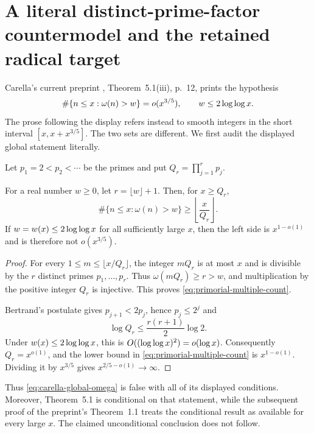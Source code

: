 \section{A literal distinct-prime-factor countermodel and the retained radical target}
\label{sec:carella-global-omega}

Carella's current preprint \cite{Carella}, Theorem~5.1(iii), p.~12,
prints the hypothesis
\begin{equation}\label{eq:carella-global-omega}
 \#\{n\le x:\omega(n)>w\}=o(x^{3/5}),
 \qquad w\le2\log\log x.
\end{equation}
The prose following the display refers instead to smooth integers in the
short interval $[x,x+x^{3/5}]$.  The two sets are different.  We first audit
the displayed global statement literally.

Let $p_1=2<p_2<\cdots$ be the primes and put
$Q_r=\prod_{j=1}^r p_j$.

\begin{theorem}
\label{thm:carella-primorial-multiples}
For a real number $w\ge0$, let $r=\lfloor w\rfloor+1$.  Then, for
$x\ge Q_r$,
\begin{equation}\label{eq:primorial-multiple-count}
 \#\{n\le x:\omega(n)>w\}\ge
       \left\lfloor\frac{x}{Q_r}\right\rfloor.
\end{equation}
If $w=w(x)\le2\log\log x$ for all sufficiently large $x$, then the
left side is $x^{1-o(1)}$ and is therefore not $o(x^{3/5})$.
\end{theorem}

\begin{proof}
For every $1\le m\le\lfloor x/Q_r\rfloor$, the integer $mQ_r$ is at most
$x$ and is divisible by the $r$ distinct primes $p_1,\ldots,p_r$.  Thus
$\omega(mQ_r)\ge r>w$, and multiplication by the positive integer $Q_r$
is injective.  This proves \eqref{eq:primorial-multiple-count}.

Bertrand's postulate gives $p_{j+1}<2p_j$, hence $p_j\le2^j$ and
\[
 \log Q_r\le \frac{r(r+1)}{2}\log2.
\]
Under $w(x)\le2\log\log x$, this is $O((\log\log x)^2)=o(\log x)$.
Consequently $Q_r=x^{o(1)}$, and the lower bound in
\eqref{eq:primorial-multiple-count} is $x^{1-o(1)}$.  Dividing it by
$x^{3/5}$ gives $x^{2/5-o(1)}\to\infty$.
\end{proof}

Thus \eqref{eq:carella-global-omega} is false with all of its displayed
conditions.  Moreover, Theorem~5.1 is conditional on that statement, while
the subsequent proof of the preprint's Theorem~1.1 treats the conditional
result as available for every large $x$.  The claimed unconditional
conclusion does not follow.

